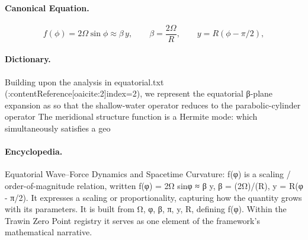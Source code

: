 \paragraph{Canonical Equation.}
\[
f(\phi) = 2\Omega \sin\phi \approx \beta\, y, \qquad \beta = \frac{2\Omega}{R}, \qquad y = R(\phi - \pi/2),
\]

\paragraph{Dictionary.}
Building upon the analysis in equatorial.txt (:contentReference[oaicite:2]index=2), we represent the equatorial β-plane expansion as so that the shallow-water operator reduces to the parabolic-cylinder operator The meridional structure function is a Hermite mode: which simultaneously satisfies a geo

\paragraph{Encyclopedia.}
Equatorial Wave–Force Dynamics and Spacetime Curvature: f(φ) is a scaling / order-of-magnitude relation, written f(φ) = 2Ω sinφ ≈ β y, β = (2Ω)/(R), y = R(φ - π/2). It expresses a scaling or proportionality, capturing how the quantity grows with its parameters. It is built from Ω, φ, β, π, y, R, defining f(φ). Within the Trawin Zero Point registry it serves as one element of the framework's mathematical narrative.
